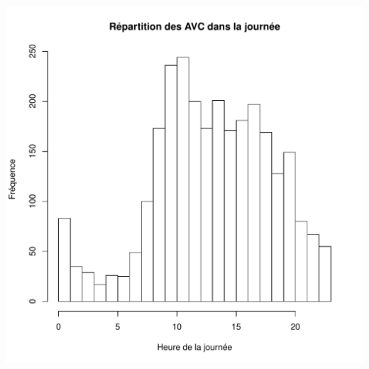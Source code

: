 \documentclass[12pt,english,french,twoside]{book}\usepackage[]{graphicx}\usepackage[]{color}
\makeatletter
\def\maxwidth{ %
  \ifdim\Gin@nat@width>\linewidth
    \linewidth
  \else
    \Gin@nat@width
  \fi
}
\newenvironment{knitrout}{}{} %
\makeatother
\begin{document}
\begin{knitrout}
\color{fgcolor}
\includegraphics[width=\maxwidth]{figure/heure_avc1} 


\end{knitrout}
\end{document}
